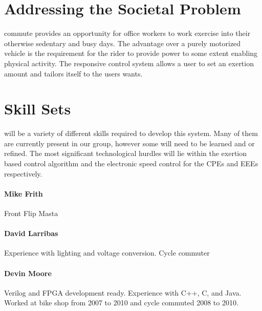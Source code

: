 \documentclass[12pt,article]{IEEEtran}
\begin{document}

     
\section{Addressing the Societal Problem}
    
     commute provides an opportunity for office workers to work exercise into 
    their otherwise sedentary and busy days.  The advantage over a purely motorized vehicle is the
    requirement for the rider to provide power to some extent enabling physical activity. The 
    responsive control system allows a user to set an exertion amount and tailors itself to the 
    users wants.

\section{\bfseries Skill Sets}
     will be a variety of different skills required to develop this system.
     Many of them are currently present in our group, however some will need to be learned and or
     refined. The most significant technological hurdles will lie within the exertion based control
     algorithm and the electronic speed control for the CPEs and EEEs respectively.

    \paragraph{\bfseries Mike Frith}
        Front Flip Masta

    \paragraph{\bfseries David Larribas}
        Experience with lighting and voltage conversion. Cycle commuter

    \paragraph{\bfseries Devin Moore}
    Verilog and FPGA development ready. Experience with C++, C, and Java. Worked at bike 
    shop from 2007 to 2010 and cycle commuted 2008 to 2010.
    
\end{document}
